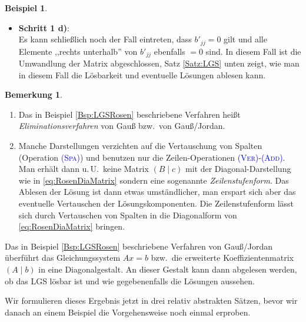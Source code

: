\documentclass[a4paper,11pt,oneside]{article}
\theoremstyle{definition}
\newtheorem{remark}{Bemerkung}
\newtheorem{example}{Beispiel}
\def\OP#1{\textcolor{blue}{(\textnormal{\textrm{\textsc{#1}})}}}
\begin{document}
\begin{example}
\begin{enumerate}
\begin{itemize}
\item
\textbf{Schritt 1 d)}:~\\
Es kann schließlich noch der Fall eintreten, dass $b'_{jj}=0$ gilt und alle Elemente ,,rechts unterhalb'' von $b'_{jj}$ ebenfalls $=0$ sind. In diesem Fall ist die Umwandlung der Matrix abgeschlossen, Satz \ref{Satz:LGS} unten zeigt, wie man in diesem Fall die Lösbarkeit und eventuelle Lösungen ablesen kann.
\end{itemize}
\end{enumerate}
\end{example}

\begin{remark}\label{Bem:Gauss}
\begin{enumerate}
\item
Das in Beispiel \ref{Bsp:LGSRosen} beschriebene Verfahren heißt \emph{Eliminationsverfahren} von Gauß bzw.\ von Gauß/Jordan.
\item
Manche Darstellungen verzichten auf die Vertauschung von Spalten (Operation \OP{Spa}) und benutzen nur die Zeilen-Operationen \OP{Ver}-\OP{Add}. Man erhält dann u.\,U.\ keine Matrix $(B\mid c)$ mit der Diagonal-Darstellung wie in \eqref{eq:RosenDiaMatrix} sondern eine sogenannte \emph{Zeilenstufenform}. Das Ablesen der Lösung ist dann etwas umständlicher, man erspart sich aber das eventuelle Vertauschen der Lösungskomponenten. Die Zeilenstufenform lässt sich durch Vertauschen von Spalten in die Diagonalform von \eqref{eq:RosenDiaMatrix} bringen.
\end{enumerate}
\end{remark}


Das in Beispiel \ref{Bsp:LGSRosen} beschriebene Verfahren von Gauß/Jordan überführt das Gleichungssystem $Ax=b$ bzw.\ die erweiterte Koeffizientenmatrix $(A\mid b)$ in eine Diagonalgestalt. An dieser Gestalt kann dann abgelesen werden, ob das LGS lösbar ist und wie
gegebenenfalls die Lösungen aussehen.

Wir formulieren dieses Ergebnis jetzt in drei relativ abstrakten Sätzen, bevor wir danach an einem Beispiel die Vorgehensweise noch einmal erproben.
\end{document}
